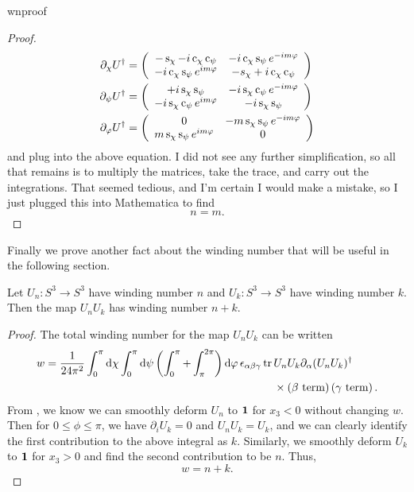 \begin{proposition}{}{wnproof}
\begin{proof}
\begin{equation*}
\begin{aligned}
    \partial_\chi U^\dagger
             &=\left(\begin{array}{cc}
                  -\operatorname{s}_\chi-i\operatorname{c}_\chi\operatorname{c}_\psi  & -i\operatorname{c}_\chi\operatorname{s}_\psi e^{-im\varphi}\\
                 -i\operatorname{c}_\chi\operatorname{s}_\psi e^{im\varphi} & -s_\chi+i\operatorname{c}_\chi\operatorname{c}_\psi 
                \end{array}\right)\\
    \partial_\psi U^\dagger
             &=\left(\begin{array}{cc}
                  +i\operatorname{s}_\chi\operatorname{s}_\psi & -i\operatorname{s}_\chi\operatorname{c}_\psi e^{-im\varphi}\\
                 -i\operatorname{s}_\chi\operatorname{c}_\psi e^{im\varphi} & -i\operatorname{s}_\chi\operatorname{s}_\psi 
                \end{array}\right)\\
  \partial_\varphi U^\dagger
             &=\left(\begin{array}{cc}
                  0 & -m\operatorname{s}_\chi\operatorname{s}_\psi e^{-im\varphi}\\
                 m\operatorname{s}_\chi\operatorname{s}_\psi e^{im\varphi} & 0 
                \end{array}\right)
  \end{aligned}
  \end{equation*}
  and plug into the above equation. I did not see any further simplification,
  so all that remains is to multiply the matrices, take the trace, and
  carry out the integrations. That seemed tedious, and I'm certain I would
  make a mistake, so I just plugged this into Mathematica to find 
  $$n=m.$$
\end{proof}\end{proposition}

Finally we prove another fact about the winding number that will be useful
in the following section.
\begin{proposition}{}{}
  Let $U_n:S^3\to S^3$ have winding number $n$ and
  $U_k:S^3\to S^3$ have winding number $k$. Then the map
  $U_n U_k$ has winding number $n+k$.
  \begin{proof}
    The total winding number for the map $U_n U_k$ can be written
    \begin{equation*}\begin{aligned}
      w=\frac{1}{24\pi^2}\int_0^\pi\dd{\chi}\int_0^\pi\dd{\psi}
          \left(\int_0^\pi+\int_\pi^{2\pi}\right)\dd{\varphi}
          \epsilon_{\alpha\beta\gamma}\tr\,
          &U_nU_k\partial_\alpha(U_nU_k)^\dagger\\
          &\times\left(\text{$\beta$ term}\right)
          \left(\text{$\gamma$ term}\right).
    \end{aligned}\end{equation*}
    From , we know we can smoothly
    deform $U_n$ to ${\mathbf 1}$ for $x_3<0$ without changing $w$.
    Then for $0\leq\phi\leq\pi$, we have
    $\partial_i U_k=0$ and $U_n U_k=U_k$, and we can clearly identify
    the first contribution to the above integral as $k$.
    Similarly, we smoothly deform $U_k$ to ${\mathbf 1}$ for
    $x_3>0$ and find the second contribution to be $n$. Thus,
    $$w=n+k.$$
  \end{proof}
\end{proposition}


